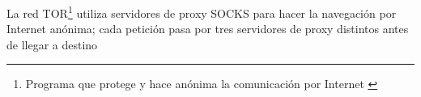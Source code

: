 \vspace*{5mm}

La red TOR\footnote{Programa que protege y hace anónima la comunicación por Internet \autocite{TOR}} utiliza servidores de proxy SOCKS para hacer la navegación por Internet anónima; cada petición pasa por tres servidores de proxy distintos antes de llegar a destino













\clearpage
\printbibliography


